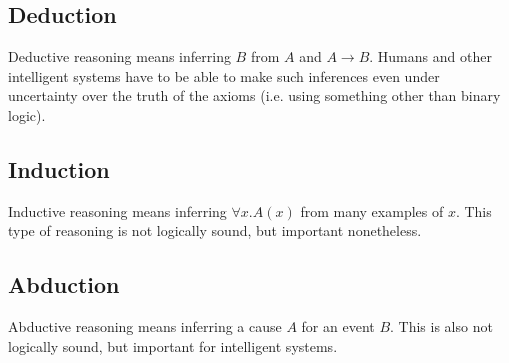 \documentclass[10pt,a4paper]{article}
\begin{document}
\subsection{Deduction}
Deductive reasoning means inferring $B$ from $A$ and $A \to B$. Humans and other intelligent systems have to be able to make such inferences even under uncertainty over the truth of the axioms (i.e. using something other than binary logic).

\subsection{Induction}
Inductive reasoning means inferring $\forall x. A(x)$ from many examples of $x$. This type of reasoning is not logically sound, but important nonetheless.

\subsection{Abduction}
Abductive reasoning means inferring a cause $A$ for an event $B$. This is also not logically sound, but important for intelligent systems.


\end{document}
